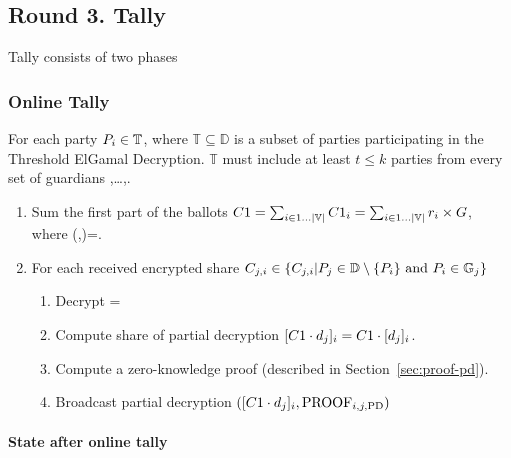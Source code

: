 \documentclass{article}
\begin{document}
\subsection{Round 3. Tally}

Tally consists of two phases
\subsubsection{Online Tally}

For each party $P_{i} \in \mathbb{T}$, where $\mathbb{T} \subseteq  \mathbb{D}$ is a subset of parties participating in the Threshold ElGamal Decryption. $\mathbb{T}$ must include at least $t \leq k$ parties from every set of guardians ,\dots,.
\begin{enumerate}
    \item Sum the first part of the ballots $C1 = \sum_{i \in 1 \dots |\mathbb{V}|} C1_{i} = \sum_{i \in 1 \dots |\mathbb{V}|} r_{i} \times G$, where (,)=.
    \item For each received encrypted share $C_{j,i} \in \{ C_{j,i} | P_{j} \in \mathbb{D} \setminus \{P_{i}\} \text{ and } P_{i} \in \mathbb{G}_{j}\}$ \begin{enumerate}
        \item Decrypt =
        \item Compute share of partial decryption  $[C1 \cdot d_{j}]_{i} = C1 \cdot [d_{j}]_{i}$. %
        \item Compute a zero-knowledge proof  (described in Section~\ref{sec:proof-pd}).
        \item Broadcast partial decryption $([C1 \cdot d_{j}]_{i}, \textrm{PROOF}_{i,j,\textrm{PD}})$
    \end{enumerate}
    
\end{enumerate}

\paragraph{State after online tally}
\end{document}
